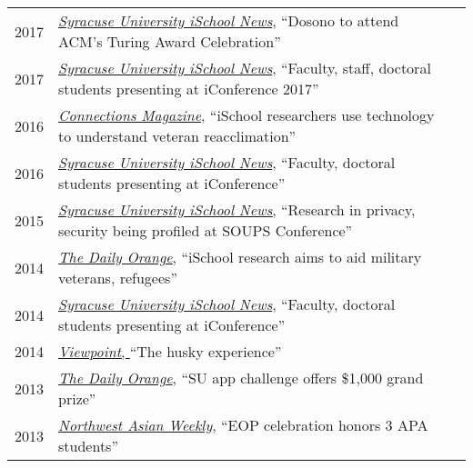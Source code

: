 \documentclass[11pt]{article}
\begin{document}
{{\begin{longtable}{Rp{0.75in}p{5.0in}}
\footnotesize{2017} & \href{https://ischool.syr.edu/dosono-to-attend-acm-turing-award-celebration/}{\textit{{Syracuse University iSchool News}}}, ``Dosono to attend ACM's Turing Award Celebration''\\

\footnotesize{2017} & \href{https://ischool.syr.edu/faculty-staff-phd-students-presenting-iconference-2017/}{\textit{{Syracuse University iSchool News}}}, ``Faculty, staff, doctoral students presenting at iConference 2017''\\

\footnotesize{2016} & \href{https://issuu.com/kiefercreative/docs/suischool-connections-sp2016}{\textit{{Connections Magazine}}}, ``iSchool researchers use technology to understand veteran reacclimation''\\

\footnotesize{2016} & \href{https://ischool.syr.edu/faculty-phd-students-presenting-at-iconference-2016/}{\textit{{Syracuse University iSchool News}}}, ``Faculty, doctoral students presenting at iConference''\\

\footnotesize{2015} & \href{https://ischool.syr.edu/research-in-privacy-security-profiled-at-soups-conference/}{\textit{{Syracuse University iSchool News}},} ``Research in privacy, security being profiled at SOUPS Conference''\\

\footnotesize{2014} & \href{http://dailyorange.com/2014/11/ischool-research-aims-to-aid-military-veterans-refugees/}{\textit{{The Daily Orange}},} ``iSchool research aims to aid military veterans, refugees''\\

\footnotesize{2014} & \href{https://ischool.syr.edu/faculty-doctoral-students-presenting-at-iconference/}{\textit{{Syracuse University iSchool News}}}, ``Faculty, doctoral students presenting at iConference''\\

\footnotesize{2014} & \href{https://issuu.com/uwalumni/docs/viewpoint_2014fall}{\textit{{Viewpoint}}, }``The husky experience''\\

\footnotesize{2013} & \href{http://dailyorange.com/2013/10/su-app-challenge-offers-1000-grand-prize/}{\textit{{The Daily Orange}}}, ``SU app challenge offers \$1,000 grand prize''\\

\footnotesize{2013} & \href{http://www.nwasianweekly.com/2013/07/uw-2013-eop-celebration-honors-3-apa-students/}{\textit{{Northwest Asian Weekly}}}, ``EOP celebration honors 3 APA students''\\


\end{longtable}}}
\end{document}
